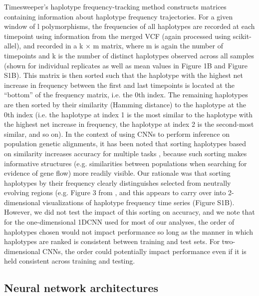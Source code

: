 Timesweeper’s haplotype frequency-tracking method constructs matrices containing information about haplotype frequency trajectories. For a given window of l polymorphisms, the frequencies of all haplotypes are recorded at each timepoint using information from the merged VCF (again processed using scikit-allel), and recorded in a k × m matrix, where m is again the number of timepoints and k is the number of distinct haplotypes observed across all samples (shown for individual replicates as well as mean values in Figure 1B and Figure S1B). This matrix is then sorted such that the haplotype with the highest net increase in frequency between the first and last timepoints is located at the “bottom” of the frequency matrix, i.e. the 0th index. The remaining haplotypes are then sorted by their similarity (Hamming distance) to the haplotype at the 0th index (i.e. the haplotype at index 1 is the most similar to the haplotype with the highest net increase in frequency, the haplotype at index 2 is the second-most similar, and so on). In the context of using CNNs to perform inference on population genetic alignments, it has been noted that sorting haplotypes based on similarity increases accuracy for multiple tasks \cite{flagelUnreasonableEffectivenessConvolutional2019,rayIntroUNETIdentifyingIntrogressed2023}, because such sorting makes informative structures (e.g. similarities between populations when searching for evidence of gene flow) more readily visible. Our rationale was that sorting haplotypes by their frequency clearly distinguishes selected from neutrally evolving regions (e.g. Figure 3 from \cite{garudRecentSelectiveSweeps2015}, and this appears to carry over into 2-dimensional visualizations of haplotype frequency time series (Figure S1B). However, we did not test the impact of this sorting on accuracy, and we note that for the one-dimensional 1DCNN used for most of our analyses, the order of haplotypes chosen would not impact performance so long as the manner in which haplotypes are ranked is consistent between training and test sets. For two-dimensional CNNs, the order could potentially impact performance even if it is held consistent across training and testing. \\

\subsection{Neural network architectures}


